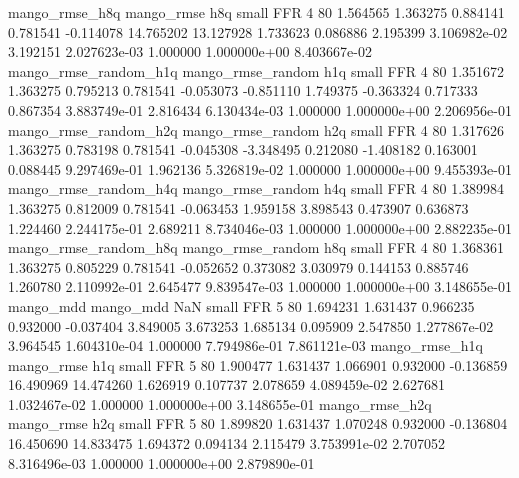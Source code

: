        mango_rmse_h8q        mango_rmse                  h8q      small      FFR                 4 80 1.564565       1.363275 0.884141       0.781541   -0.114078     14.765202     13.127928     1.733623       0.086886  2.195399 3.106982e-02     3.192151   2.027623e-03            1.000000    1.000000e+00        8.403667e-02
mango_rmse_random_h1q mango_rmse_random                  h1q      small      FFR                 4 80 1.351672       1.363275 0.795213       0.781541   -0.053073     -0.851110      1.749375    -0.363324       0.717333  0.867354 3.883749e-01     2.816434   6.130434e-03            1.000000    1.000000e+00        2.206956e-01
mango_rmse_random_h2q mango_rmse_random                  h2q      small      FFR                 4 80 1.317626       1.363275 0.783198       0.781541   -0.045308     -3.348495      0.212080    -1.408182       0.163001  0.088445 9.297469e-01     1.962136   5.326819e-02            1.000000    1.000000e+00        9.455393e-01
mango_rmse_random_h4q mango_rmse_random                  h4q      small      FFR                 4 80 1.389984       1.363275 0.812009       0.781541   -0.063453      1.959158      3.898543     0.473907       0.636873  1.224460 2.244175e-01     2.689211   8.734046e-03            1.000000    1.000000e+00        2.882235e-01
mango_rmse_random_h8q mango_rmse_random                  h8q      small      FFR                 4 80 1.368361       1.363275 0.805229       0.781541   -0.052652      0.373082      3.030979     0.144153       0.885746  1.260780 2.110992e-01     2.645477   9.839547e-03            1.000000    1.000000e+00        3.148655e-01
            mango_mdd         mango_mdd                  NaN      small      FFR                 5 80 1.694231       1.631437 0.966235       0.932000   -0.037404      3.849005      3.673253     1.685134       0.095909  2.547850 1.277867e-02     3.964545   1.604310e-04            1.000000    7.794986e-01        7.861121e-03
       mango_rmse_h1q        mango_rmse                  h1q      small      FFR                 5 80 1.900477       1.631437 1.066901       0.932000   -0.136859     16.490969     14.474260     1.626919       0.107737  2.078659 4.089459e-02     2.627681   1.032467e-02            1.000000    1.000000e+00        3.148655e-01
       mango_rmse_h2q        mango_rmse                  h2q      small      FFR                 5 80 1.899820       1.631437 1.070248       0.932000   -0.136804     16.450690     14.833475     1.694372       0.094134  2.115479 3.753991e-02     2.707052   8.316496e-03            1.000000    1.000000e+00        2.879890e-01
